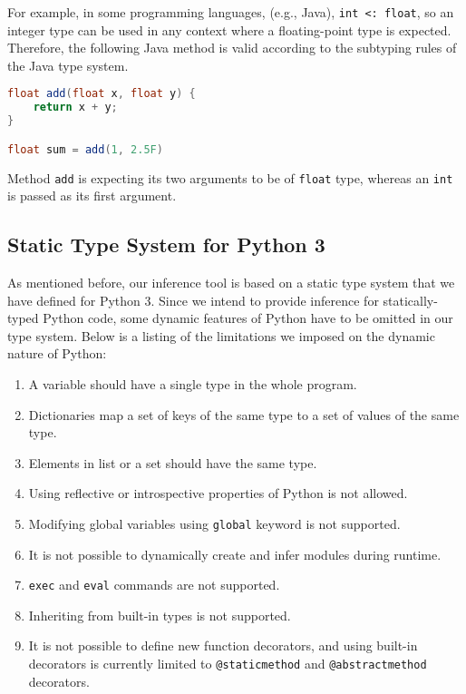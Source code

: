 For example, in some programming languages, (e.g., Java), \lstinline|int <: float|, so an integer type can be used in any context where a floating-point type is expected. Therefore, the following Java method is valid according to the subtyping rules of the Java type system.

\begin{lstlisting}[language=java]
float add(float x, float y) {
	return x + y;
}

float sum = add(1, 2.5F)
\end{lstlisting}

Method \lstinline|add| is expecting its two arguments to be of \lstinline|float| type, whereas an \lstinline|int| is passed as its first argument.


\subsection{Static Type System for Python 3}
As mentioned before, our inference tool is based on a static type system that we have defined for Python 3. Since we intend to provide inference for statically-typed Python code, some dynamic features of Python have to be omitted in our type system. Below is a listing of the limitations we imposed on the dynamic nature of Python:
\begin{enumerate}
	\item A variable should have a single type in the whole program.
	\item Dictionaries map a set of keys of the same type to a set of values of the same type.
	\item Elements in list or a set should have the same type.
	\item Using reflective or introspective properties of Python is not allowed.
	\item Modifying global variables using \lstinline|global| keyword is not supported.
	\item It is not possible to dynamically create and infer modules during runtime.
	\item \lstinline|exec| and \lstinline|eval| commands are not supported.
	\item Inheriting from built-in types is not supported.
	\item It is not possible to define new function decorators, and using built-in decorators is currently limited to \lstinline|@staticmethod| and \lstinline|@abstractmethod| decorators.
\end{enumerate}

